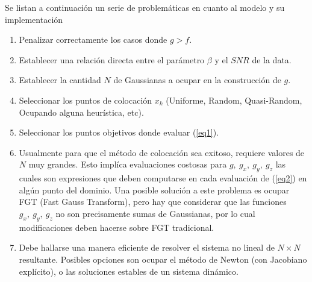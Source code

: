\documentclass[spanish, fleqn]{article}
\begin{document}
Se listan a continuación un serie de problemáticas en cuanto al modelo y su implementación

\begin{enumerate}
    \item Penalizar correctamente los casos donde $g>f$.
    \item Establecer una relación directa entre el parámetro $\beta$ y el $SNR$ de la data.
    \item Establecer la cantidad $N$ de Gaussianas a ocupar en la construcción de $g$.
    \item Seleccionar los puntos de colocación $x_k$ (Uniforme, Random, Quasi-Random, Ocupando alguna heurística, etc).
    \item Seleccionar los puntos objetivos donde evaluar (\ref{eq1}).
    \item Usualmente para que el método de colocación sea exitoso, requiere valores de $N$ muy grandes. Esto implíca
    evaluaciones costosas para $g,\ g_x,\ g_y,\ g_z$ las cuales son expresiones que deben computarse en cada evaluación
    de (\ref{eq2}) en algún punto del dominio. Una posible solución a este problema es ocupar FGT (Fast Gauss Transform),
    pero hay que considerar que las funciones $g_x,\ g_y,\ g_z$ no son precisamente sumas de Gaussianas, por lo cual
    modificaciones deben hacerse sobre FGT tradicional.
    \item Debe hallarse una manera eficiente de resolver el sistema no lineal de $N \times N$ resultante. Posibles opciones
    son ocupar el método de Newton (con Jacobiano explícito), o las soluciones estables de un sistema dinámico.  
\end{enumerate}
\end{document}
